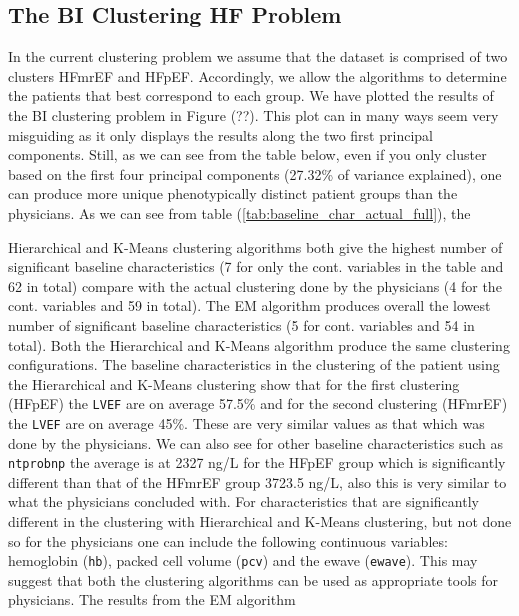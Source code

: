 \documentclass[../thesis.tex]{subfiles}
\begin{document}
\subsection{The BI Clustering HF Problem}
\label{subsec:bi_clust}

In the current clustering problem we assume that the dataset is comprised of two clusters HFmrEF and HFpEF. Accordingly, we allow the algorithms to determine the patients that best correspond to each group. We have plotted the results of the BI clustering problem in Figure (??). This plot can in many ways seem very misguiding as it only displays the results along the two first principal components. Still, as we can see from the table below, even if you only cluster based on the first four principal components (27.32\% of variance explained), one can produce more unique phenotypically distinct patient groups than the physicians. As we can see from table (\ref{tab:baseline_char_actual_full}), the 





\noindent Hierarchical and K-Means clustering algorithms both give the highest number of significant baseline characteristics (7 for only the cont. variables in the table and 62 in total) compare with the actual clustering done by the physicians (4 for the cont. variables and 59 in total). The EM algorithm produces overall the lowest number of significant baseline characteristics (5 for cont. variables and 54 in total). Both the Hierarchical and K-Means algorithm produce the same clustering configurations. The baseline characteristics in the clustering of the patient using the Hierarchical and K-Means clustering show that for the first clustering (HFpEF) the \texttt{LVEF} are on average 57.5\% and for the second clustering (HFmrEF) the \texttt{LVEF} are on average 45\%. These are very similar values as that which was done by the physicians. We can also see for other baseline characteristics such as \texttt{ntprobnp} the average is at 2327 ng/L for the HFpEF group which is significantly different than that of the HFmrEF group 3723.5 ng/L, also this is very similar to what the physicians concluded with. For characteristics that are significantly different in the clustering with Hierarchical and K-Means clustering, but not done so for the physicians one can include the following continuous variables: hemoglobin (\texttt{hb}), packed cell volume (\texttt{pcv}) and the ewave (\texttt{ewave}). This may suggest that both the clustering algorithms can be used as appropriate tools for physicians. The results from the EM algorithm 
\end{document}
